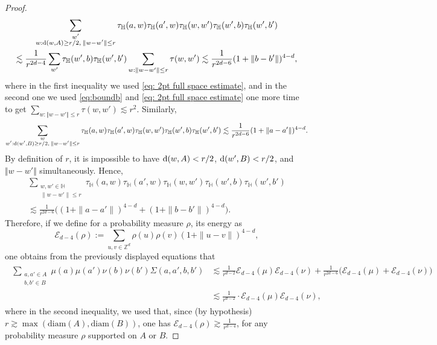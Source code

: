 \documentclass[11pt,a4paper]{article}
\numberwithin{equation}{section}
\theoremstyle{plain}
\theoremstyle{definition}
\begin{document}
\begin{proof}
\begin{multline}
	\sum_{\substack{w'\\w: \textup{d}(w,A)\geq r/2, \: \Vert w-w'\Vert \leq r}}\tau_{\mathbb H}(a,w)\tau_{\mathbb H}(a',w)  \tau_{\mathbb H}(w,w')\tau_{\mathbb H}(w',b)\tau_{\mathbb H}(w',b')\\\lesssim \frac{1}{r^{2d-4}}\sum_{w'}\tau_{\mathbb H}(w',b)\tau_{\mathbb H}(w',b')\sum_{w: \Vert w-w'\Vert \leq r}\tau(w,w')\lesssim \frac{1}{r^{2d-6}}(1+\Vert b-b'\Vert)^{4-d},
\end{multline}
where in the first inequality we used \eqref{eq: 2pt full space estimate}, and in the second one we used \eqref{eq:boundb} and \eqref{eq: 2pt full space estimate} one more time to get $\sum_{w: \Vert w-w'\Vert \leq r}\tau(w,w')\lesssim r^2$. Similarly,
\begin{equation}
	\sum_{\substack{w\\w': \textup{d}(w',B)\geq r/2, \: \Vert w-w'\Vert \leq r}}\tau_{\mathbb H}(a,w)\tau_{\mathbb H}(a',w)  \tau_{\mathbb H}(w,w')\tau_{\mathbb H}(w',b)\tau_{\mathbb H}(w',b')\lesssim \frac{1}{r^{2d-6}}(1+\Vert a-a'\Vert)^{4-d}.
\end{equation}
By definition of $r$, it is impossible to have $\textup{d}(w,A)<r/2$, $\textup{d}(w',B)<r/2$, and $\Vert w-w'\Vert$ simultaneously. Hence,
\begin{multline}
	\sum_{\substack{w,w'\in \mathbb H\\\| w-w'\|\le r}}  \tau_{\mathbb H}(a,w)\tau_{\mathbb H}(a',w)  \tau_{\mathbb H}(w,w')\tau_{\mathbb H}(w',b)\tau_{\mathbb H}(w',b')\\\lesssim \frac 1{r^{2d-6}} \Big((1+ \|a-a'\|)^{4-d} + (1+ \|b-b'\|)^{4-d}\Big).
\end{multline}
Therefore, if we define for a probability measure $\rho$, its energy as 
\begin{equation}
\mathcal E_{d-4}(\rho) :=  \sum_{u,v\in \mathbb Z^d} \rho(u)\rho(v) (1+\|u-v\|)^{4-d},
\end{equation} 
one obtains from the previously displayed equations that
\begin{align}\label{sumSigma} 
\begin{split}
\sum_{\substack{a,a'\in A\\b,b'\in B}} \mu(a)\mu(a') \nu(b)\nu(b') \Sigma(a,a',b,b') & \lesssim \frac 1{r^{d-2}} \mathcal E_{d-4}(\mu) \mathcal E_{d-4}(\nu) + \frac 1{r^{2d-6}} \Big(\mathcal E_{d-4}(\mu) + \mathcal E_{d-4}(\nu)\Big)\\
&\lesssim  \frac 1{r^{d-2}} \cdot \mathcal E_{d-4}(\mu) \mathcal E_{d-4}(\nu), 
\end{split}
\end{align} 
where in the second inequality, we used that, since (by hypothesis) $r\gtrsim  \max(\textrm{diam}(A), \textrm{diam}(B))$, one has $\mathcal E_{d-4}(\rho) \gtrsim \frac{1}{r^{d-4}}$, for any probability measure $\rho$ supported on $A$ or $B$.  


\end{proof}
\end{document}
